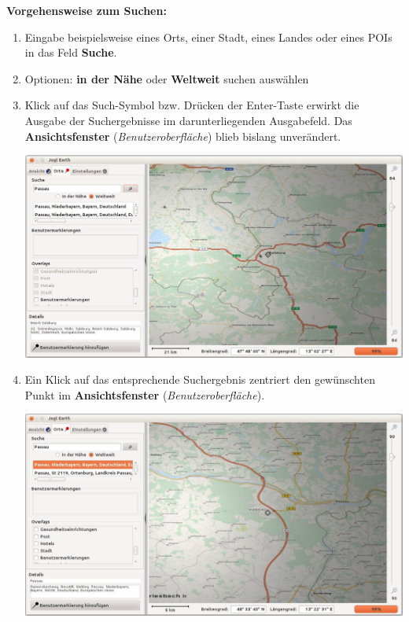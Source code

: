 \documentclass[10pt]{scrreprt}
\newcommand{\textref}[1]{\mbox{\raisebox{0.1ex}{\small$\rightarrow$ }\textit{#1}}}
\begin{document}
\newpage
\textbf{Vorgehensweise zum Suchen:}
\begin{enumerate}
\item Eingabe beispielsweise eines Orts, einer Stadt, eines Landes oder eines POIs in das Feld \textbf{Suche}.
\item Optionen: \textbf{in der Nähe} oder \textbf{Weltweit} suchen auswählen
\item Klick auf das Such-Symbol bzw. Drücken der Enter-Taste erwirkt die Ausgabe der Suchergebnisse im darunterliegenden Ausgabefeld. Das \textbf{Ansichtsfenster} (\textref{Benutzeroberfläche}) blieb bislang unverändert.
	\vspace{2mm}
	\begin{center}
	\includegraphics[scale=0.25]{images/flacheKarte_suche1.jpg}
	\end{center}
\item Ein Klick auf das entsprechende Suchergebnis zentriert den gewünschten Punkt im \textbf{Ansichtsfenster} (\textref{Benutzeroberfläche}).
	\vspace{2mm}
	\begin{center}
	\includegraphics[scale=0.25]{images/flacheKarte_suche2.jpg}
	\end{center}

\end{enumerate}
\end{document}
